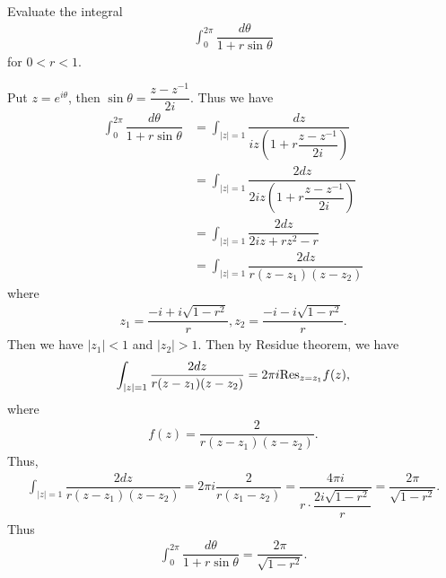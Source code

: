 \begin{problem}
Evaluate the integral 
\begin{align*}
    \int_0^{2\pi}\dfrac{d\theta}{1+r\sin\theta}
\end{align*}
for $0<r<1.$
\begin{solution}
Put $z=e^{i\theta}$, then $\sin\theta=\dfrac{z-z^{-1}}{2i}$. Thus we have 
\begin{align*}
     \int_0^{2\pi}\dfrac{d\theta}{1+r\sin\theta}&=\int_{|z|=1}\dfrac{dz}{iz(1+r\dfrac{z-z^{-1}}{2i})}\\
     &=\int_{|z|=1}\dfrac{2dz}{2iz(1+r\dfrac{z-z^{-1}}{2i})}\\
     &=\int_{|z|=1}\dfrac{2dz}{2iz+rz^2-r}\\
     &=\int_{|z|=1}\dfrac{2dz}{r(z-z_1)(z-z_2)}
\end{align*}
where 
\begin{align*}
    z_1=\dfrac{-i+i\sqrt{1-r^2}}{r},z_2=\dfrac{-i-i\sqrt{1-r^2}}{r}.
\end{align*}
Then we have $|z_1|<1$ and $|z_2|>1.$ Then by Residue theorem, we have 
\begin{align*}
    \int_{|z|=1}\dfrac{2dz}{r(z-z_1)(z-z_2)}=2\pi i{\rm Res}_{z=z_1}f(z),
    \end{align*}
    where 
    \begin{align*}
        f(z)=\dfrac{2}{r(z-z_1)(z-z_2)}.
    \end{align*}
    Thus, 
    \begin{align*}
        \int_{|z|=1}\dfrac{2dz}{r(z-z_1)(z-z_2)}=2\pi i\dfrac{2}{r(z_1-z_2)}=\dfrac{4\pi i}{r\cdot \dfrac{2i\sqrt{1-r^2}}{r}}=\dfrac{2\pi}{ {\sqrt{1-r^2}}}.
    \end{align*}
    Thus \begin{align*}
        \int_0^{2\pi}\dfrac{d\theta}{1+r\sin\theta}=\dfrac{2\pi}{\sqrt{1-r^2}}.
    \end{align*}
\end{solution}
\end{problem}

